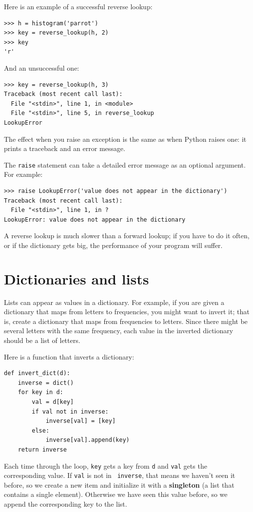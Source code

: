 \documentclass[10pt]{book}
\begin{document}
Here is an example of a successful reverse lookup:

\begin{verbatim}
>>> h = histogram('parrot')
>>> key = reverse_lookup(h, 2)
>>> key
'r'
\end{verbatim}
%
And an unsuccessful one:

\begin{verbatim}
>>> key = reverse_lookup(h, 3)
Traceback (most recent call last):
  File "<stdin>", line 1, in <module>
  File "<stdin>", line 5, in reverse_lookup
LookupError
\end{verbatim}
%
The effect when you raise an exception is the same as when
Python raises one: it prints a traceback and an error message.

The {\tt raise} statement can take a detailed error message as an
optional argument.  For example:

\begin{verbatim}
>>> raise LookupError('value does not appear in the dictionary')
Traceback (most recent call last):
  File "<stdin>", line 1, in ?
LookupError: value does not appear in the dictionary
\end{verbatim}
%
A reverse lookup is much slower than a forward lookup; if you
have to do it often, or if the dictionary gets big, the performance
of your program will suffer.


\section{Dictionaries and lists}
\label{invert}

Lists can appear as values in a dictionary.  For example, if you
are given a dictionary that maps from letters to frequencies, you
might want to invert it; that is, create a dictionary that maps
from frequencies to letters.  Since there might be several letters
with the same frequency, each value in the inverted dictionary
should be a list of letters.

Here is a function that inverts a dictionary:

\begin{verbatim}
def invert_dict(d):
    inverse = dict()
    for key in d:
        val = d[key]
        if val not in inverse:
            inverse[val] = [key]
        else:
            inverse[val].append(key)
    return inverse
\end{verbatim}
%
Each time through the loop, {\tt key} gets a key from {\tt d} and 
{\tt val} gets the corresponding value.  If {\tt val} is not in {\tt
  inverse}, that means we haven't seen it before, so we create a new
item and initialize it with a {\bf singleton} (a list that contains a
single element).  Otherwise we have seen this value before, so we
append the corresponding key to the list.  
\end{document}
